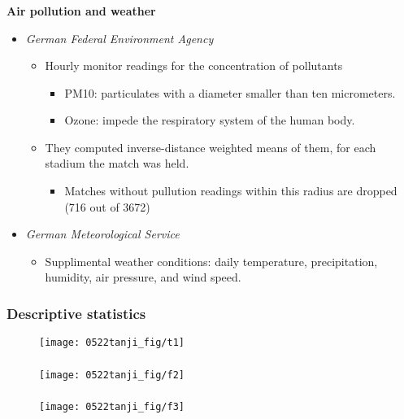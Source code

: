\documentclass[dvipdfmx,11pt]{beamer}
\begin{document}
\begin{frame}\frametitle{}
  \textbf{Air pollution and weather}
  \begin{itemize}
    \item \textit{German Federal Environment Agency}
    \begin{itemize}
      \item Hourly monitor readings for the concentration of pollutants
      \begin{itemize}
        \item PM10: particulates with a diameter smaller than ten micrometers.
        \item Ozone: impede the respiratory system of the human body.
      \end{itemize}
      \item They computed inverse-distance weighted means of them, for each stadium the match was held.
      \begin{itemize}
        \item Matches without pullution readings within this radius are dropped (716 out of 3672)
      \end{itemize}
    \end{itemize}
    \item \textit{German Meteorological Service}
    \begin{itemize}
      \item Supplimental weather conditions: daily temperature, precipitation, humidity, air pressure, and wind speed.
    \end{itemize}
  \end{itemize}
\end{frame}

\begin{frame}\frametitle{Descriptive statistics}
  \begin{figure}
    \centering
    \texttt{[image: 0522tanji\_fig/t1]}
    \label{t1}
  \end{figure}
\end{frame}

\begin{frame}\frametitle{}
  \begin{figure}
    \centering
    \texttt{[image: 0522tanji\_fig/f2]}
    \label{f2}
  \end{figure}
\end{frame}

\begin{frame}\frametitle{}
  \begin{figure}
    \centering
    \texttt{[image: 0522tanji\_fig/f3]}
    \label{f3}
  \end{figure}
\end{frame}
\end{document}
